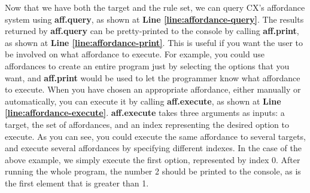 \documentclass[11pt,fleqn,openany]{book} %
\begin{document}
Now that we have both the target and the rule set, we can query CX's affordance system using \textbf{aff.query}, as shown at \textbf{Line \ref{line:affordance-query}}. The results returned by \textbf{aff.query} can be pretty-printed to the console by calling \textbf{aff.print}, as shown at \textbf{Line \ref{line:affordance-print}}. This is useful if you want the user to be involved on what affordance to execute. For example, you could use affordances to create an entire program just by selecting the options that you want, and \textbf{aff.print} would be used to let the programmer know what affordance to execute. When you have chosen an appropriate affordance, either manually or automatically, you can execute it by calling \textbf{aff.execute}, as shown at \textbf{Line \ref{line:affordance-execute}}. \textbf{aff.execute} takes three arguments as inputs: a target, the set of affordances, and an index representing the desired option to execute. As you can see, you could execute the same affordance to several targets, and execute several affordances by specifying different indexes. In the case of the above example, we simply execute the first option, represented by index 0. After running the whole program, the number 2 should be printed to the console, as is the first element that is greater than 1.
\end{document}
